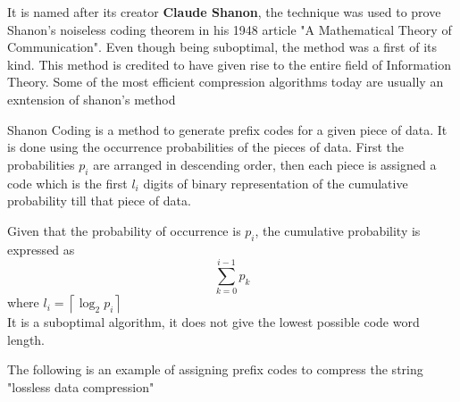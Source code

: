 \documentclass{article}
\begin{document}
It is named after its creator \textbf{Claude Shanon}, the technique was used to prove Shanon's noiseless coding theorem in his 1948 article "A Mathematical Theory of Communication". Even though being suboptimal, the method was a first of its kind. This method is credited to have given rise to the entire field of Information Theory. Some of the most efficient compression algorithms today are usually an exntension of shanon's method

Shanon Coding is a method to generate prefix codes for a given piece of data. It is done using the occurrence probabilities of the pieces of data. First the probabilities $p_{i}$ are arranged in descending order, then each piece is assigned a code which is the first $l_{i}$ digits of binary representation of the cumulative probability till that piece of data. 


Given that the probability of occurrence is $p_{i}$, the cumulative probability is expressed as 
$$\sum_{k=0}^{i-1} p_{k}$$ where $l_{i} = \left \lceil \log_{2} p_{i} \right \rceil$ \\

It is a suboptimal algorithm, it does not give the lowest possible code word length.

The following is an example of assigning prefix codes to compress the string "lossless data compression"
\end{document}
